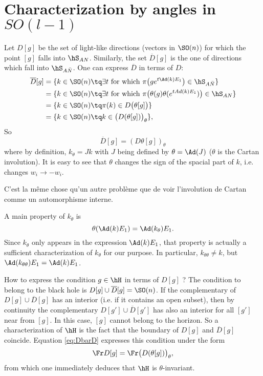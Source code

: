 
\section{Characterization by angles in \texorpdfstring{$SO(l-1)$}{SOl-1}}

Let $D[g]$ be the set of light-like directions (vectors in $\SO(n)$) for which the point $[g]$ falls into $\hS_{AN}$. Similarly, the set $\overline{D}[g]$ is the one of directions which fall into $\hS_{A \bar{N}}$. One can express $\overline{ D }$ in terms of $D$:
\[
\begin{split}
\overline{ D }[g]&=\{ k\in\SO(n)\tq\exists t\text{ for which }\pi\big( g e^{t\Ad(k)E_1} \big)\in\hS_{A\bar N} \}\\
		&=\{ k\in\SO(n)\tq\exists t\text{ for which }\pi\big( \theta(g)\theta( e^{tAd(k)E_1}) \big)\in\hS_{AN}\}\\
		&=\{ k\in\SO(n)\tq \pi(k)\in D\big( \theta[g] \big)\}\\
		&=\{ k\in\SO(n)\tq k\in\big( D(\theta[g]) \big)_{\theta}\},
\end{split}
\]
So
\begin{equation} \label{eq:DbarD}
\overline{D}[g]=(D\theta[g])_{\theta}
\end{equation}
where by definition, $k_{\theta}=Jk$ with $J$ being defined by $\theta=\Ad(J)$ ($\theta$ is the Cartan involution). It is easy to see that $\theta$ changes the sign of the spacial part of $k$, i.e. changes $w_i\to -w_i$.

\begin{probleme}
C'est la même chose qu'un autre problème que de voir l'involution de Cartan comme un automorphisme interne.
\label{propCrtadeux}
\end{probleme}

 A main property of $k_{\theta}$ is
\[
	\theta(\Ad(k)E_1)=\Ad(k_{\theta})E_1.
\]
Since $k_{\theta}$ only appears in the expression $\Ad(k)E_1$, that property is actually a sufficient characterization of $k_{\theta}$ for our purpose. In particular, $k_{\theta\theta}\neq k$, but $\Ad(k_{\theta\theta})E_1=\Ad(k)E_1$.

How to express the condition $g\in\hH$ in terms of $D[g]$ ? The condition to belong to the black hole is $D[g]\cup \overline{D}[g]=\SO(n)$. If the complementary of $D[g]\cup \overline{D}[g]$ has an interior (i.e. if it contains an open subset), then by continuity the complementary $D[g']\cup \overline{D}[g']$ has also an interior for all $[g']$ near from $[g]$. In this case, $[g]$ cannot belong to the horizon. So a characterization of $\hH$ is the fact that the boundary of $D[g]$ and $\overline{D}[g]$ coincide. Equation \eqref{eq:DbarD} expresses this condition under the form
\begin{equation}
  \Fr D[g]=\Fr \big( D(\theta[g])\big)_{\theta},
 \end{equation}
from which one immediately deduces that $\hH$ is $\theta$-invariant.


